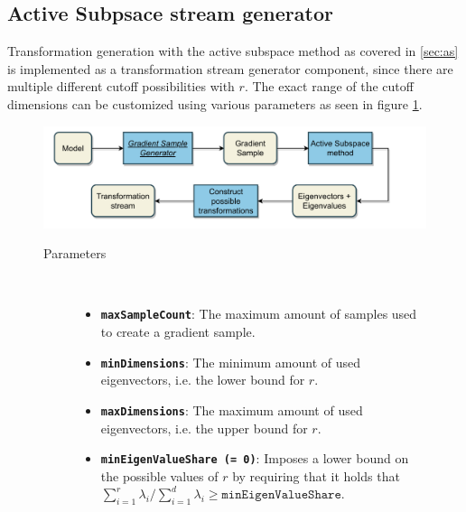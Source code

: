\documentclass[
  a4paper,  %
  twoside,  %
  bibliography=totoc,
  headsepline,
  cleardoublepage=empty,
  parskip=half,
  draft=false
]{scrbook}
\begin{document}
\newpage

\subsection{Active Subpsace stream generator}

Transformation generation with the active subspace method as covered in \cref{sec:as} is implemented as a transformation stream generator component, since there are multiple different cutoff possibilities with $r$.
The exact range of the cutoff dimensions can be customized using various parameters as seen in figure \cref{fig:astsg}.

\begin{mdframed}[style=style,frametitle={Transformation stream generator (active subspaces)}]
\begin{figure}[H]
\vspace{5px}
\includegraphics[width=\textwidth]{graphics/TransformationStreamGen_AS.pdf}

\delimit

\begin{description}
\item[Parameters] {~ \begin{itemize}[\indent{}]
\item \texttt{\textbf{maxSampleCount}}: The maximum amount of samples used to create a gradient sample.
\item \texttt{\textbf{minDimensions}}: The minimum amount of used eigenvectors, i.e. the lower bound for $r$.
\item \texttt{\textbf{maxDimensions}}: The maximum amount of used eigenvectors, i.e. the upper bound for $r$.
\item \texttt{\textbf{minEigenValueShare (= 0)}}: Imposes a lower bound on the possible values of $r$ by requiring that it holds that $\sum_{i=1}^r \lambda_i / \sum_{i=1}^d \lambda_i \geq \texttt{minEigenValueShare}$.
\end{itemize}}
\end{description}
\delimit
{}
\label{fig:astsg}
\end{figure}
\end{mdframed}
\end{document}
